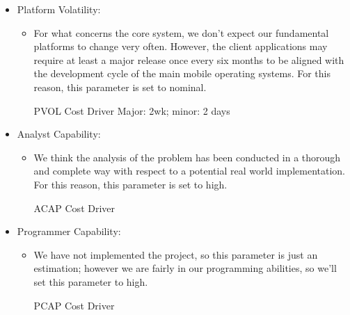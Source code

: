\begin{itemize}
	\item Platform Volatility: 
	\begin{itemize}
	\item[] For what concerns the core system, we don't expect our fundamental platforms to change very often. However, the client applications may require at least a major release once every six months to be aligned with the development cycle of the main mobile operating systems. For this reason, this parameter is set to nominal.
	\pagebreak
	\begin{costdriverstable}{PVOL Cost Driver}
			{Major: 2wk; minor: 2 days}{}\hline
	\end{costdriverstable}
	\end{itemize}
\end{itemize}

\begin{itemize}
	\item Analyst Capability: 
	\begin{itemize}
	\item[] We think the analysis of the problem has been conducted in a thorough and complete way with respect to a potential real world implementation. For this reason, this parameter is set to high.
	\begin{costdriverstable}{ACAP Cost Driver}
		\hline
	\end{costdriverstable}
	\end{itemize}
\end{itemize}

\begin{itemize}
	\item Programmer Capability: 
	\begin{itemize}
	\item[] We have not implemented the project, so this parameter is just an estimation; however we are fairly in our programming abilities, so we'll set this parameter to high.
	\begin{costdriverstable}{PCAP Cost Driver}
		\hline
	\end{costdriverstable}
	\end{itemize}
\end{itemize}

